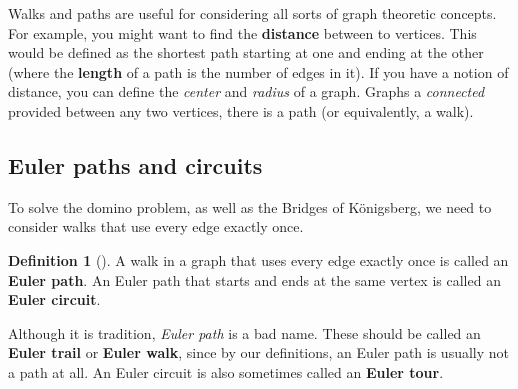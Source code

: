 \documentclass[10pt,]{book}
\newcommand{\terminology}[1]{\textbf{#1}}
\theoremstyle{plain}
\theoremstyle{definition}
\newtheorem{definition}[theorem]{Definition}
\theoremstyle{definition}
\theoremstyle{definition}
\numberwithin{equation}{chapter}
\begin{document}
\par
\hypertarget{p-135}{}%
Walks and paths are useful for considering all sorts of graph theoretic concepts.  For example, you might want to find the \terminology{distance} between to vertices.  This would be defined as the shortest path starting at one and ending at the other (where the \terminology{length} of a path is the number of edges in it).  If you have a notion of distance, you can define the \emph{center} and \emph{radius} of a graph.  Graphs a \emph{connected} provided between any two vertices, there is a path (or equivalently, a walk).%
\typeout{************************************************}
\typeout{************************************************}
\subsection[{Euler paths and circuits}]{Euler paths and circuits}\label{subsec_eulerpaths}
\hypertarget{p-136}{}%
To solve the domino problem, as well as the Bridges of Königsberg, we need to consider walks that use every edge exactly once.%
\begin{definition}[{}]\label{def-eulerpath}
\hypertarget{p-137}{}%
A walk in a graph that uses every edge exactly once is called an \terminology{Euler path}.  An Euler path that starts and ends at the same vertex is called an \terminology{Euler circuit}.%
\end{definition}
\hypertarget{p-138}{}%
Although it is tradition, \emph{Euler path} is a bad name.  These should be called an \terminology{Euler trail} or \terminology{Euler walk}, since by our definitions, an Euler path is usually not a path at all.  An Euler circuit is also sometimes called an \terminology{Euler tour}.%
\end{document}
